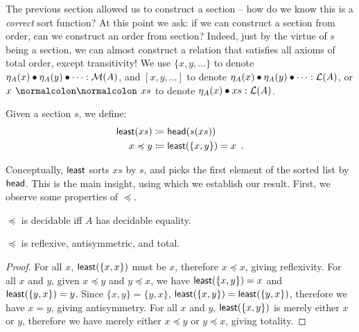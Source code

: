 The previous section allowed us to construct a section -- how do we know this is a \emph{correct} sort function?
%
At this point we ask: if we can construct a section from order, can we construct an order from section?
%
Indeed, just by the virtue of $s$ being a section, we can almost construct a relation that satisfies
all axioms of total order, except transitivity!
We use $\{x,y,\dots\}$ to denote $\eta_A(x) \mathbin{\bullet} \eta_A(y) \mathbin{\bullet} \dots : \mathcal{M}(A)$,
and $[x, y, \dots]$ to denote $\eta_A(x) \mathbin{\bullet} \eta_A(y) \mathbin{\bullet} \dots : \mathcal{L}(A)$,
or $x \cons xs$ to denote $\eta_A(x) \mathbin{\bullet} xs : \mathcal{L}(A)$.

\begin{definition}
    \label{def:least}
    Given a section $s$, we define:
    \[
        \begin{aligned}
            \operatorname{\mathsf{least}}(xs) & \mathrel{\coloneq} \operatorname{\mathsf{head}}(s(xs))                    \\
            x \preccurlyeq y & \mathrel{\coloneq} \operatorname{\mathsf{least}}(\{x, y\}) = x \enspace .
        \end{aligned}
    \]
\end{definition}

Conceptually, $\operatorname{\mathsf{least}}$ sorts $xs$ by $s$, and picks the first element of the sorted list by~$\operatorname{\mathsf{head}}$.
This is the main insight, using which we establish our result.
First, we observe some properties of $\preccurlyeq$.

\begin{proposition}
    $\preccurlyeq$ is decidable iff $A$ has decidable equality.
\end{proposition}

\begin{proposition}\label{sort:almost-total}
    $\preccurlyeq$ is reflexive, antisymmetric, and total.
\end{proposition}
\begin{proof}
    For all $x$, $\operatorname{\mathsf{least}}(\{x, x\})$ must be $x$, therefore $x \preccurlyeq x$, giving reflexivity.
    For all $x$ and $y$, given $x \preccurlyeq y$ and $y \preccurlyeq x$,
    we have $\operatorname{\mathsf{least}}(\{x, y\}) = x$ and $\operatorname{\mathsf{least}}(\{y, x\}) = y$.
    Since $\{x, y\} = \{y, x\}$, $\operatorname{\mathsf{least}}(\{x, y\}) = \operatorname{\mathsf{least}}(\{y, x\})$,
    therefore we have $x = y$, giving antisymmetry.
    For all $x$ and $y$, $\operatorname{\mathsf{least}}(\{x, y\})$ is merely either $x$ or $y$,
    therefore we have merely either $x \preccurlyeq y$ or $y \preccurlyeq x$, giving totality.
\end{proof}

